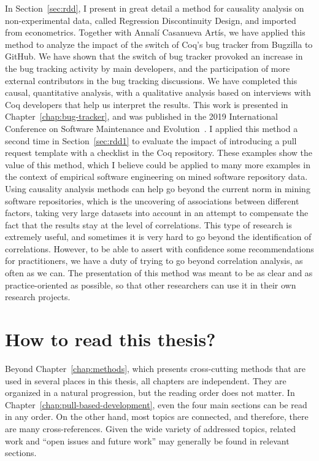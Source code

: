 In Section~\ref{sec:rdd}, I present in great detail a method for causality analysis on non-experimental data, called Regression Discontinuity Design, and imported from econometrics.
Together with Annal\'i Casanueva Art\'is, we have applied this method to analyze the impact of the switch of Coq's bug tracker from Bugzilla to GitHub.
We have shown that the switch of bug tracker provoked an increase in the bug tracking activity by main developers, and the participation of more external contributors in the bug tracking discussions.
We have completed this causal, quantitative analysis, with a qualitative analysis based on interviews with Coq developers that help us interpret the results.
This work is presented in Chapter~\ref{chap:bug-tracker}, and was published in the 2019 International Conference on Software Maintenance and Evolution~\cite{zimmermann:hal-01951176}.
I applied this method a second time in Section~\ref{sec:rdd1} to evaluate the impact of introducing a pull request template with a checklist in the Coq repository.
These examples show the value of this method, which I believe could be applied to many more examples in the context of empirical software engineering on mined software repository data.
Using causality analysis methods can help go beyond the current norm in mining software repositories, which is the uncovering of associations between different factors, taking very large datasets into account in an attempt to compensate the fact that the results stay at the level of correlations.
This type of research is extremely useful, and sometimes it is very hard to go beyond the identification of correlations.
However, to be able to assert with confidence some recommendations for practitioners, we have a duty of trying to go beyond correlation analysis, as often as we can.
The presentation of this method was meant to be as clear and as practice-oriented as possible, so that other researchers can use it in their own research projects.

\section{How to read this thesis?}

Beyond Chapter~\ref{chap:methods}, which presents cross-cutting methods that are used in several places in this thesis, all chapters are independent.
They are organized in a natural progression, but the reading order does not matter.
In Chapter~\ref{chap:pull-based-development}, even the four main sections can be read in any order.
On the other hand, most topics are connected, and therefore, there are many cross-references.
Given the wide variety of addressed topics, related work and ``open issues and future work'' may generally be found in relevant sections.

